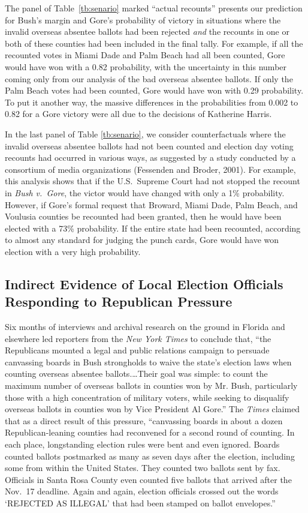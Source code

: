 \documentclass[11pt,titlepage]{article}
\begin{document}
The panel of Table~\ref{tb:senario} marked ``actual recounts''
presents our prediction for Bush's margin and Gore's probability of
victory in situations where the invalid overseas absentee ballots had
been rejected \emph{and} the recounts in one or both of these counties
had been included in the final tally.  For example, if all the
recounted votes in Miami Dade and Palm Beach had all been counted,
Gore would have won with a 0.82 probability, with the uncertainty in
this number coming only from our analysis of the bad overseas absentee
ballots.  If only the Palm Beach votes had been counted, Gore would
have won with 0.29 probability.  To put it another way, the massive
differences in the probabilities from 0.002 to 0.82 for a Gore victory
were all due to the decisions of Katherine Harris.

In the last panel of Table \ref{tb:senario}, we consider
counterfactuals where the invalid overseas absentee ballots had not
been counted and election day voting recounts had occurred in various
ways, as suggested by a study conducted by a consortium of media
organizations (Fessenden and Broder, 2001).  For example, this
analysis shows that if the U.S.\ Supreme Court had not stopped the
recount in \emph{Bush v.\ Gore}, the victor would have changed with
only a 1\% probability.  However, if Gore's formal request that
Broward, Miami Dade, Palm Beach, and Voulusia counties be recounted
had been granted, then he would have been elected with a 73\%
probability.  If the entire state had been recounted, according to
almost any standard for judging the punch cards, Gore would have won
election with a very high probability.

\subsection{Indirect Evidence of Local Election Officials Responding
  to Republican Pressure}

Six months of interviews and archival research on the ground in
Florida and elsewhere led reporters from the \emph{New York Times}
to conclude that, ``the Republicans mounted a legal and public
relations campaign to persuade canvassing boards in Bush strongholds
to waive the state's election laws when counting overseas absentee
ballots.\ldots Their goal was simple: to count the maximum number of
overseas ballots in counties won by Mr.  Bush, particularly those with
a high concentration of military voters, while seeking to disqualify
overseas ballots in counties won by Vice President Al Gore.''  The
\emph{Times} claimed that as a direct result of this pressure,
``canvassing boards in about a dozen Republican-leaning counties had
reconvened for a second round of counting.  In each place,
longstanding election rules were bent and even ignored.  Boards
counted ballots postmarked as many as seven days after the election,
including some from within the United States.  They counted two
ballots sent by fax.  Officials in Santa Rosa County even counted five
ballots that arrived after the Nov.\ 17 deadline.  Again and again,
election officials crossed out the words `REJECTED AS ILLEGAL' that
had been stamped on ballot envelopes.''
\end{document}
